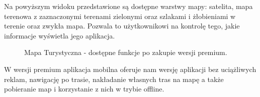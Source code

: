 Na powyższym widoku przedstawione są dostępne warstwy mapy: satelita, mapa terenowa z zaznaczonymi terenami zielonymi oraz szlakami i żłobieniami w terenie oraz zwykła mapa. Pozwala to użytkownikowi na kontrolę tego, jakie informacje wyświetla jego aplikacja. 
\begin{figure}[H]
    \centering
    \caption{Mapa Turystyczna - dostępne funkcje po zakupie wersji premium.}
    \label{mapatu:premium}
\end{figure}
W wersji premium aplikacja mobilna oferuje nam wersję aplikacji bez uciążliwych reklam, nawigację po trasie, nakładanie własnych tras na mapę a także pobieranie map i korzystanie z nich w trybie offline.
\\

